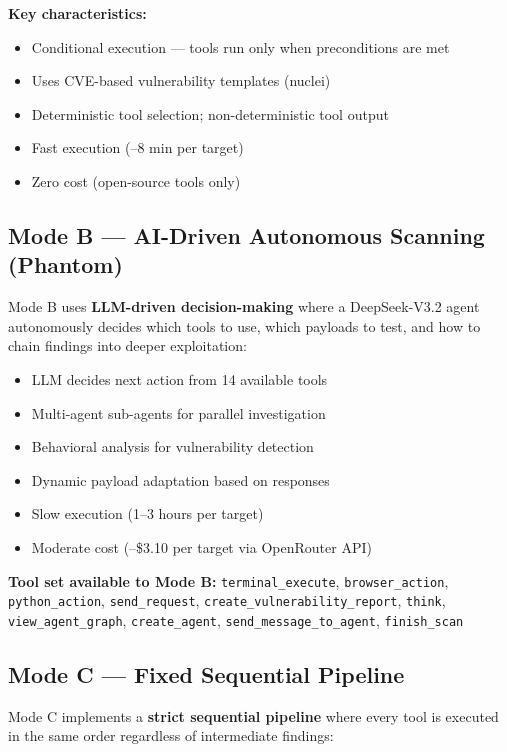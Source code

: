 \documentclass[12pt,a4paper,oneside]{book}
\begin{document}
\textbf{Key characteristics:}
\begin{itemize}
    \item Conditional execution — tools run only when preconditions are met
    \item Uses CVE-based vulnerability templates (nuclei)
    \item Deterministic tool selection; non-deterministic tool output
    \item Fast execution (–8 min per target)
    \item Zero cost (open-source tools only)
\end{itemize}

\subsection{Mode B — AI-Driven Autonomous Scanning (Phantom)}

Mode B uses \textbf{LLM-driven decision-making} where a DeepSeek-V3.2 agent autonomously decides which tools to use, which payloads to test, and how to chain findings into deeper exploitation:

\begin{itemize}
    \item LLM decides next action from 14 available tools
    \item Multi-agent sub-agents for parallel investigation
    \item Behavioral analysis for vulnerability detection
    \item Dynamic payload adaptation based on responses
    \item Slow execution (1–3 hours per target)
    \item Moderate cost (–\$3.10 per target via OpenRouter API)
\end{itemize}

\textbf{Tool set available to Mode B:} \texttt{terminal\_execute}, \texttt{browser\_action}, \texttt{python\_action}, \texttt{send\_request}, \texttt{create\_vulnerability\_report}, \texttt{think}, \texttt{view\_agent\_graph}, \texttt{create\_agent}, \texttt{send\_message\_to\_agent}, \texttt{finish\_scan}

\subsection{Mode C — Fixed Sequential Pipeline}

Mode C implements a \textbf{strict sequential pipeline} where every tool is executed in the same order regardless of intermediate findings:
\end{document}
